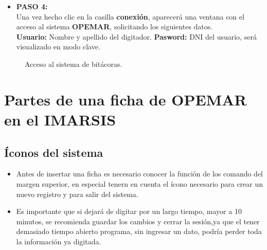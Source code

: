 \documentclass[a4paper,oneside,11pt]{book}
\begin{document}
\begin{itemize}
\item\textbf{PASO 4:} \\
Una vez hecho clic en la casilla \textbf{conexión}, aparecerá una ventana con el acceso al sistema \textbf{OPEMAR}, solicitando los siguientes datos.\\
\subitem\textbf{Usuario:} Nombre y apellido del digitador.
\subitem\textbf{Pasword:} DNI del usuario, será visualizado en modo clave.
\end{itemize}


\begin{figure} [!h]
\begin{center}
 \caption{Acceso al sistema de bitácoras.}
\end{center}
 \end{figure}






  
  
  
\chapter { Partes de una ficha de OPEMAR en el IMARSIS}
\section{ Íconos del sistema}
\begin{itemize}
\item {Antes de insertar una ficha es necesario conocer la función de los comando del margen superior, en especial tenern en cuenta el ícono necesario para crear un nuevo registro y para salir del sistema.}
\item {Es importante que si dejará de digitar por un largo tiempo, mayor a 10 minutos, se recomienda guardar los cambios y cerrar la sesión,ya que el tener demasiado tiempo abierto programa, sin ingresar un dato, podría perder toda la información ya digitada.}
\end{itemize}
\end{document}
